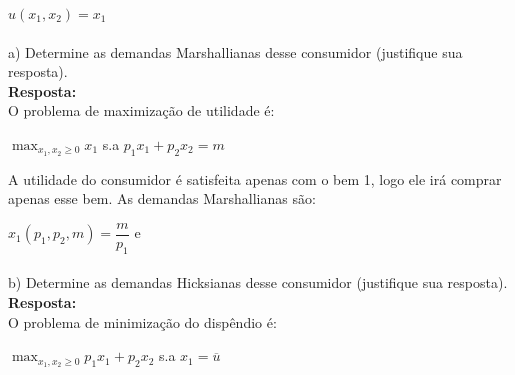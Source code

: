 \begin{enumerate}
\begin{center}
{$u(x_1, x_2) = x_1$}
\end{center}

\paragraph{} a) Determine as demandas Marshallianas desse consumidor (justifique sua resposta).\\

\textbf{Resposta:}\\

O problema de maximização de utilidade é:\\

\begin{center}
{$\displaystyle\max_{x_{1}, x_{2} \geq 0} x_{1}$} \hspace{0.05cm} s.a \hspace{0.05cm} {$p_{1}x_{1}+p_{2}x_{2} = m$}\\

\end{center}

A utilidade do consumidor é satisfeita apenas com o bem 1, logo ele irá comprar apenas esse bem. As demandas Marshallianas são:\\

\begin{center}
{$x_{1}(p_{1},p_{2}, m) = \dfrac{m}{p_{1}}$} \hspace{0.5cm} e  \\
\end{center}


\paragraph{} b) Determine as demandas Hicksianas desse consumidor (justifique sua resposta).\\

\textbf{Resposta:}\\

O problema de minimização do dispêndio é:\\

\begin{center}
{$\displaystyle\max_{x_{1}, x_{2} \geq 0} p_{1}x_{1}+p_{2}x_{2}$} \hspace{0.05cm} s.a \hspace{0.05cm} {$x_{1} = \overline{u}$}\\
\end{center}  


\end{enumerate}
